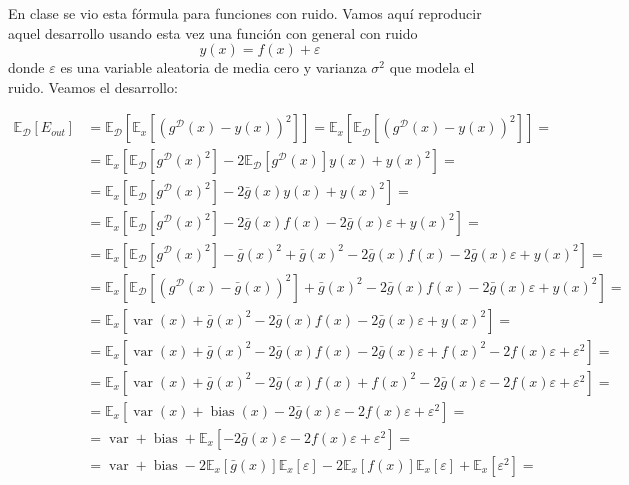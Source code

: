 \documentclass[a4paper, 11pt]{article}
\begin{document}
      \begin{solucion}
          En clase se vio esta fórmula para funciones con ruido. Vamos aquí reproducir aquel desarrollo usando esta vez una función con general con ruido
          \[
          y(x) = f(x) + \varepsilon
          \]
          donde $\varepsilon$ es una variable aleatoria de media cero y varianza $\sigma^2$ que modela el ruido. Veamos el desarrollo:

          \begin{align*}
              \mathbb{E}_\mathcal{D}[E_{out}] &= \mathbb{E}_\mathcal{D}[\mathbb{E}_x[(g^\mathcal{D}(x) - y(x))^2]] = \mathbb{E}_x[\mathbb{E}_\mathcal{D}[(g^\mathcal{D}(x) - y(x))^2]] = \\
              &= \mathbb{E}_x[\mathbb{E}_\mathcal{D}[g^\mathcal{D}(x)^2] - 2\mathbb{E}_\mathcal{D}[g^\mathcal{D}(x)]y(x) + y(x)^2] = \\
              &= \mathbb{E}_x[\mathbb{E}_\mathcal{D}[g^\mathcal{D}(x)^2] - 2\bar{g}(x)y(x) + y(x)^2] = \\
              &= \mathbb{E}_x[\mathbb{E}_\mathcal{D}[g^\mathcal{D}(x)^2] - 2\bar{g}(x)f(x) -2\bar{g}(x)\varepsilon + y(x)^2] = \\
              &= \mathbb{E}_x[\mathbb{E}_\mathcal{D}[g^\mathcal{D}(x)^2] - \bar{g}(x)^2 +\bar{g}(x)^2 - 2\bar{g}(x)f(x) -2\bar{g}(x)\varepsilon + y(x)^2] = \\
              &= \mathbb{E}_x[\mathbb{E}_\mathcal{D}[(g^\mathcal{D}(x) - \bar{g}(x))^2] +\bar{g}(x)^2 - 2\bar{g}(x)f(x) -2\bar{g}(x)\varepsilon + y(x)^2] = \\
              &= \mathbb{E}_x[\operatorname{var}(x) +\bar{g}(x)^2 - 2\bar{g}(x)f(x) -2\bar{g}(x)\varepsilon + y(x)^2] = \\
              &= \mathbb{E}_x[\operatorname{var}(x) +\bar{g}(x)^2 - 2\bar{g}(x)f(x) -2\bar{g}(x)\varepsilon + f(x)^2 - 2f(x)\varepsilon + \varepsilon^2] = \\
              &= \mathbb{E}_x[\operatorname{var}(x) +\bar{g}(x)^2 - 2\bar{g}(x)f(x) + f(x)^2 -2\bar{g}(x)\varepsilon - 2f(x)\varepsilon + \varepsilon^2] = \\
              &= \mathbb{E}_x[\operatorname{var}(x) + \operatorname{bias}(x) -2\bar{g}(x)\varepsilon - 2f(x)\varepsilon + \varepsilon^2] = \\
              &= \operatorname{var} + \operatorname{bias} + \mathbb{E}_x[-2\bar{g}(x)\varepsilon - 2f(x)\varepsilon + \varepsilon^2] = \\
              &= \operatorname{var} + \operatorname{bias} - 2 \mathbb{E}_x[\bar{g}(x)]\mathbb{E}_x[\varepsilon] - 2\mathbb{E}_x[f(x)]\mathbb{E}_x[\varepsilon] + \mathbb{E}_x[\varepsilon^2] =\\

\end{align*}
\end{solucion}
\end{document}

